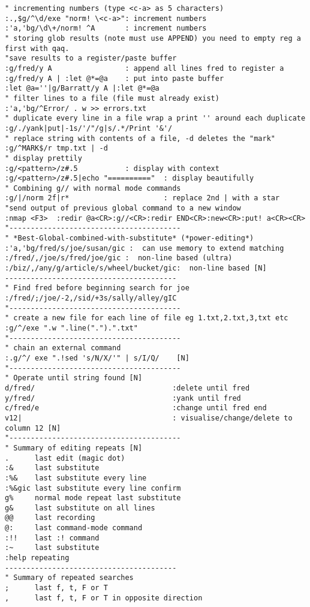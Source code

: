 \documentclass[10pt,landscape]{article}
\begin{document}
\begin{multicols}{2}
\begin{verbatim}
" incrementing numbers (type <c-a> as 5 characters)
:.,$g/^\d/exe "norm! \<c-a>": increment numbers
:'a,'bg/\d\+/norm! ^A       : increment numbers
" storing glob results (note must use APPEND) you need to empty reg a first with qaq. 
"save results to a register/paste buffer
:g/fred/y A                 : append all lines fred to register a
:g/fred/y A | :let @*=@a    : put into paste buffer
:let @a=''|g/Barratt/y A |:let @*=@a
" filter lines to a file (file must already exist)
:'a,'bg/^Error/ . w >> errors.txt
" duplicate every line in a file wrap a print '' around each duplicate
:g/./yank|put|-1s/'/"/g|s/.*/Print '&'/
" replace string with contents of a file, -d deletes the "mark"
:g/^MARK$/r tmp.txt | -d
" display prettily
:g/<pattern>/z#.5           : display with context
:g/<pattern>/z#.5|echo "=========="  : display beautifully
" Combining g// with normal mode commands
:g/|/norm 2f|r*                      : replace 2nd | with a star
"send output of previous global command to a new window
:nmap <F3>  :redir @a<CR>:g//<CR>:redir END<CR>:new<CR>:put! a<CR><CR>
"----------------------------------------
" *Best-Global-combined-with-substitute* (*power-editing*)
:'a,'bg/fred/s/joe/susan/gic :  can use memory to extend matching
:/fred/,/joe/s/fred/joe/gic :  non-line based (ultra)
:/biz/,/any/g/article/s/wheel/bucket/gic:  non-line based [N]
----------------------------------------
" Find fred before beginning search for joe
:/fred/;/joe/-2,/sid/+3s/sally/alley/gIC
"----------------------------------------
" create a new file for each line of file eg 1.txt,2.txt,3,txt etc
:g/^/exe ".w ".line(".").".txt"
"----------------------------------------
" chain an external command
:.g/^/ exe ".!sed 's/N/X/'" | s/I/Q/    [N]
"----------------------------------------
" Operate until string found [N]
d/fred/                                :delete until fred
y/fred/                                :yank until fred
c/fred/e                               :change until fred end
v12|                                   : visualise/change/delete to column 12 [N]
"----------------------------------------
" Summary of editing repeats [N]
.      last edit (magic dot)
:&     last substitute
:%&    last substitute every line
:%&gic last substitute every line confirm
g%     normal mode repeat last substitute
g&     last substitute on all lines
@@     last recording
@:     last command-mode command
:!!    last :! command
:~     last substitute
:help repeating
----------------------------------------
" Summary of repeated searches
;      last f, t, F or T
,      last f, t, F or T in opposite direction

\end{verbatim}
\end{multicols}
\end{document}

